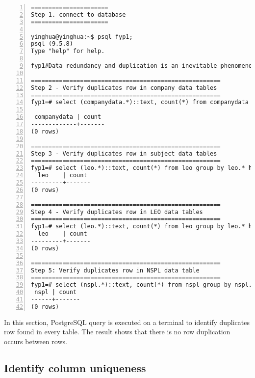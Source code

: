 \lstset{basicstyle=\ttfamily\tiny} 
\begin{lstlisting}[breaklines, frame=single, numbers=left, caption={Identify row uniqueness}, label=commandline-02]
======================
Step 1. connect to database
======================

yinghua@yinghua:~$ psql fyp1;
psql (9.5.8)
Type "help" for help.

fyp1#Data redundancy and duplication is an inevitable phenomenon found in million of data obtained from on-line sources. Unintentional duplication of records created from the data warehouse 's hard to be avoided. Therefore, the uniqueness of data has to be check in every row and columns for conduct data de-duplication in Phase 2.

======================================================
Step 2 - Verify duplicates row in company data tables
======================================================
fyp1=# select (companydata.*)::text, count(*) from companydata group by companydata.* having count(*) > 1;

 companydata | count 
-------------+-------
(0 rows)

======================================================
Step 3 - Verify duplicates row in subject data tables
======================================================
fyp1=# select (leo.*)::text, count(*) from leo group by leo.* having count(*) > 1; 
  leo    | count 
---------+-------
(0 rows)

======================================================
Step 4 - Verify duplicates row in LEO data tables
======================================================
fyp1=# select (leo.*)::text, count(*) from leo group by leo.* having count(*) > 1; 
  leo    | count 
---------+-------
(0 rows)

======================================================
Step 5: Verify duplicates row in NSPL data table
======================================================
fyp1=# select (nspl.*)::text, count(*) from nspl group by nspl.* having count(*) > 1;
 nspl | count 
------+-------
(0 rows)

\end{lstlisting}

In this section, PostgreSQL query is executed on a terminal to identify duplicates row found in every table. The result shows that there is no row duplication occurs between rows. 

\subsection{Identify column uniqueness}

